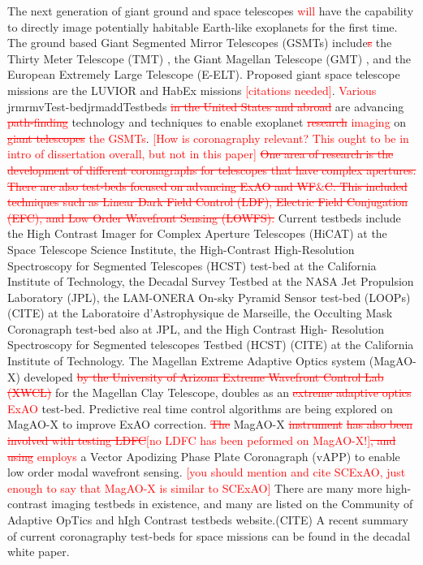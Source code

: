\documentclass[12pt]{spieman}  %
\newcommand{\jrmadd}[1]{\textcolor{red}{#1}}
\newcommand{\jrmrmv}[1]{\textcolor{red}{\sout{#1}}}
\newcommand{\jrmcom}[1]{\textcolor{red}{[#1]}}
\begin{document}
\begin{spacing}{2}
The next generation of giant ground and space telescopes \jrmadd{will} have the capability to directly image potentially habitable Earth-like exoplanets for the first time. The ground based Giant Segmented Mirror Telescopes (GSMTs) include\jrmrmv{s} the Thirty Meter Telescope (TMT) \cite{chisholm2020thirty}, the Giant Magellan Telescope (GMT) \cite{fanson2020overview}, and the European Extremely Large Telescope (E-ELT)\cite{ramsay2020eso}. Proposed giant space telescope missions are the LUVIOR and HabEx missions \jrmcom{citations needed}. \jrmadd{Various} jrmrmv{Test-bed}jrmadd{Testbed}s \jrmrmv{in the United States and abroad} are advancing \jrmrmv{path-finding} technology and techniques to enable exoplanet \jrmrmv{research} \jrmadd{imaging} on \jrmrmv{giant telescopes} \jrmadd{the GSMTs}. \jrmcom{How is coronagraphy relevant?  This ought to be in intro of dissertation overall, but not in this paper} \jrmrmv{One area of research is the development of different coronagraphs for telescopes that have complex apertures. There are also test-beds focused on advancing ExAO and WF$\&$C. This included techniques such as Linear Dark Field Control (LDF), Electric Field Conjugation (EFC), and Low Order Wavefront Sensing (LOWFS).} Current testbeds include the High Contrast Imager for Complex Aperture Telescopes (HiCAT)\cite{2014SPIE.9143E..27N} at the Space Telescope Science Institute, the High-Contrast High-Resolution Spectroscopy for Segmented Telescopes (HCST)\cite{jovanovic2018high} test-bed at the California Institute of Technology, the Decadal Survey Testbed\cite{belikov2014ames} at the NASA Jet Propulsion Laboratory (JPL), the LAM-ONERA On-sky Pyramid Sensor test-bed (LOOPs) (CITE) at the Laboratoire d'Astrophysique de Marseille, the Occulting Mask Coronagraph\cite{shi2017dynamic} test-bed also at JPL, and the High Contrast High- Resolution Spectroscopy for Segmented telescopes Testbed (HCST) (CITE) at the California Institute of Technology. The Magellan Extreme Adaptive Optics system (MagAO-X)\cite{males2020magao} developed \jrmrmv{by the University of Arizona Extreme Wavefront Control Lab (XWCL)} for the Magellan Clay Telescope, doubles as an \jrmrmv{extreme adaptive optics} \jrmadd{ExAO} test-bed. Predictive real time control algorithms are being explored on MagAO-X to improve ExAO correction.\cite{haffert2021data} \jrmrmv{The} MagAO-X \jrmrmv{instrument} \jrmrmv{has also been involved with testing LDFC}\jrmcom{no LDFC has been peformed on MagAO-X!}\jrmrmv{, and using} \jrmadd{employs} a Vector Apodizing Phase Plate Coronagraph (vAPP)\cite{snik2012vector} to enable low order modal wavefront sensing.\cite{2019JATIS...5d9004M} \jrmcom{you should mention and cite SCExAO, just enough to say that MagAO-X is similar to SCExAO} There are many more high-contrast imaging testbeds in existence, and many are listed on the Community of Adaptive OpTics and hIgh Contrast testbeds website.(CITE) A recent summary of current coronagraphy test-beds for space missions can be found in the decadal white paper.\cite{mazoyer2019high}


\end{spacing}
\end{document}
